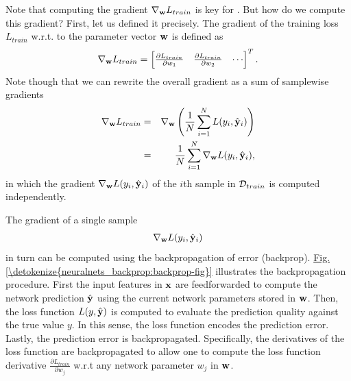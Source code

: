 \documentclass[letterpaper,10pt,english]{jupyterBook}
\begin{document}
\sphinxAtStartPar
Note that computing the gradient \( \nabla_{\bf w} L_{train} \) is key for {\hyperref[\detokenize{neuralnets_backprop:gradient_descent_alg}]{}}. But how do we compute this gradient? First, let us defined it precisely. The gradient of the training loss \(L_{train}\) w.r.t. to the parameter vector \( {\bf w} \) is defined as
\label{equation:neuralnets_backprop:e7d26445-7df6-4168-a89a-9e0acc11a457}\begin{equation}
 \nabla_{\bf w} L_{train} = \begin{bmatrix} \frac{\partial L_{train}}{\partial w_1} & \frac{\partial L_{train}}{\partial w_2} & \cdots \end{bmatrix}^{T}. 
\end{equation}
\sphinxAtStartPar
Note though that we can rewrite the overall gradient as a sum of sample\sphinxhyphen{}wise gradients
\label{equation:neuralnets_backprop:85d74021-a8bc-4579-8793-0ed4921a81e4}\begin{eqnarray}
\nabla_{\bf w} L_{train} &=& \nabla_{\bf w}  \left( {1 \over N}  \sum_{i=1}^N L(y_{i}, \hat{\bf y}_{i}) \right)  \\
&=& {1 \over N}  \sum_{i=1}^N \nabla_{\bf w} L(y_{i}, \hat{\bf y}_{i}),
\end{eqnarray}
\sphinxAtStartPar
in which the gradient \( \nabla_{\bf w} L(y_{i}, \hat{\bf y}_{i}) \) of the \(i\)\sphinxhyphen{}th sample in \( {\cal D}_{train} \) is computed independently.

\sphinxAtStartPar
The gradient of a single sample \begin{equation*}
\begin{split} \nabla_{\bf w} L(y_{i}, \hat{\bf y}_{i}) \end{split}
\end{equation*} in turn can be computed using the backpropagation of error (backprop). \hyperref[\detokenize{neuralnets_backprop:backprop-fig}]{Fig.\@ \ref{\detokenize{neuralnets_backprop:backprop-fig}}} illustrates the backpropagation procedure. First the input features in \( {\bf x} \) are feedforwarded to compute the network prediction \(\hat{\bf y} \) using the current network parameters stored in \({\bf w}\). Then, the loss function \( L(y, \hat{\bf y}) \) is computed to evaluate the prediction quality against the true value \( y \). In this sense, the loss function encodes the prediction error. Lastly, the prediction error is backpropagated. Specifically, the derivatives of the loss function are backpropagated to allow one to compute the loss function derivative \(\frac{\partial L_{train}}{\partial w_j}\) w.r.t any network parameter \( w_j \) in \( {\bf w} \).
\end{document}
